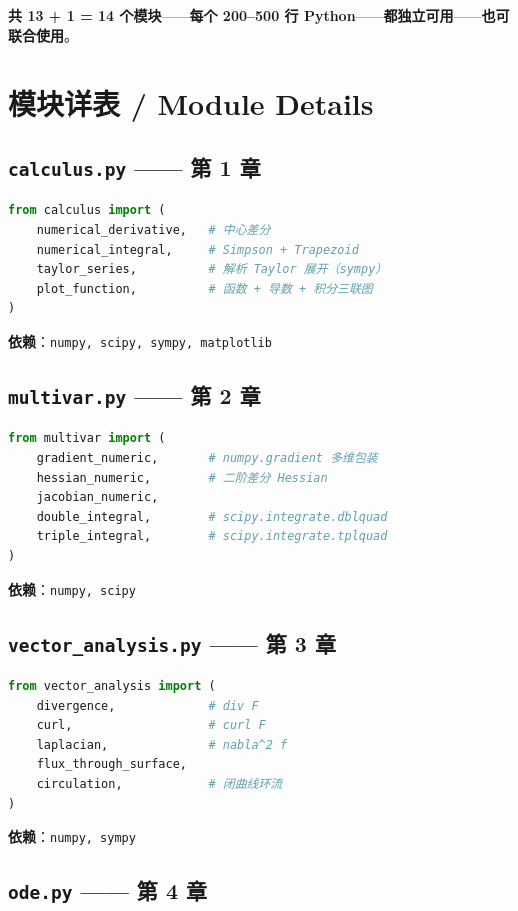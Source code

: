 \textbf{共 \textbf{13 + 1 = 14 个模块}}——\textbf{每个 200--500 行 Python}——\textbf{都\textbf{独立可用}}——\textbf{也可联合使用}。

\section{模块详表 / Module Details}

\subsection{\texttt{calculus.py} —— 第 1 章}

\begin{lstlisting}[language=Python]
from calculus import (
    numerical_derivative,   # 中心差分
    numerical_integral,     # Simpson + Trapezoid
    taylor_series,          # 解析 Taylor 展开（sympy）
    plot_function,          # 函数 + 导数 + 积分三联图
)
\end{lstlisting}
\textbf{依赖}：\texttt{numpy, scipy, sympy, matplotlib}

\subsection{\texttt{multivar.py} —— 第 2 章}

\begin{lstlisting}[language=Python]
from multivar import (
    gradient_numeric,       # numpy.gradient 多维包装
    hessian_numeric,        # 二阶差分 Hessian
    jacobian_numeric,
    double_integral,        # scipy.integrate.dblquad
    triple_integral,        # scipy.integrate.tplquad
)
\end{lstlisting}
\textbf{依赖}：\texttt{numpy, scipy}

\subsection{\texttt{vector\_analysis.py} —— 第 3 章}

\begin{lstlisting}[language=Python]
from vector_analysis import (
    divergence,             # div F
    curl,                   # curl F
    laplacian,              # nabla^2 f
    flux_through_surface,
    circulation,            # 闭曲线环流
)
\end{lstlisting}
\textbf{依赖}：\texttt{numpy, sympy}

\subsection{\texttt{ode.py} —— 第 4 章}

